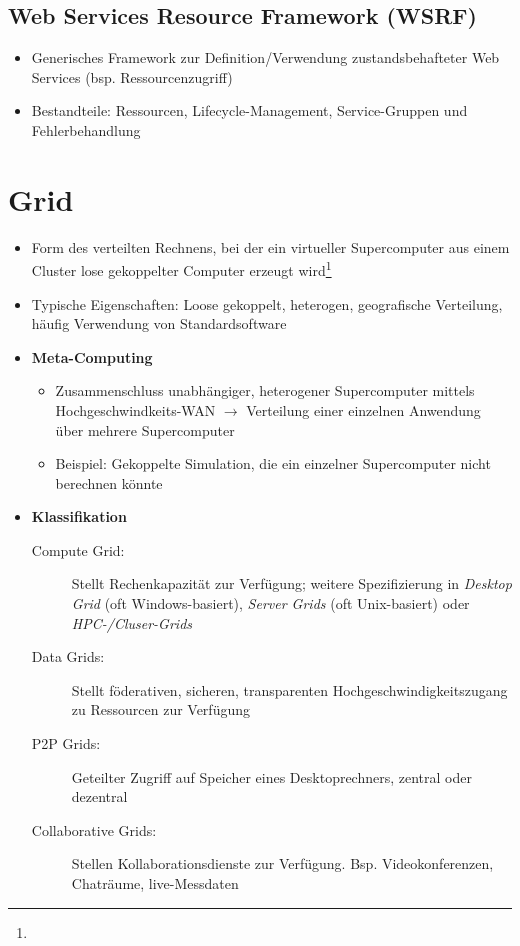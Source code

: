 \subsection{Web Services Resource Framework (WSRF)}
\begin{itemize}
	\item Generisches Framework zur Definition/Verwendung zustandsbehafteter Web Services (bsp. Ressourcenzugriff)
	\item Bestandteile: Ressourcen, Lifecycle-Management, Service-Gruppen und Fehlerbehandlung
\end{itemize}



\section{Grid}
\begin{itemize}
	\item Form des verteilten Rechnens, bei der ein virtueller Supercomputer aus einem Cluster lose gekoppelter Computer erzeugt wird\footnote{}
	\item Typische Eigenschaften: Loose gekoppelt, heterogen, geografische Verteilung, häufig Verwendung von Standardsoftware
	\item \textbf{Meta-Computing}
	\begin{itemize}
		\item Zusammenschluss unabhängiger, heterogener Supercomputer mittels Hochgeschwindkeits-WAN \(\rightarrow\) Verteilung einer einzelnen Anwendung über mehrere Supercomputer
		\item Beispiel: Gekoppelte Simulation, die ein einzelner Supercomputer nicht berechnen könnte
	\end{itemize}
	\item \textbf{Klassifikation}
	\begin{description}
		\item[Compute Grid:] Stellt Rechenkapazität zur Verfügung; weitere Spezifizierung in \textit{Desktop Grid} (oft Windows-basiert), \textit{Server Grids} (oft Unix-basiert) oder \textit{HPC-/Cluser-Grids}
		\item[Data Grids:] Stellt föderativen, sicheren, transparenten Hochgeschwindigkeitszugang zu Ressourcen zur Verfügung 
		\item[P2P Grids:] Geteilter Zugriff auf Speicher eines Desktoprechners, zentral oder dezentral
		\item[Collaborative Grids:] Stellen Kollaborationsdienste zur Verfügung. Bsp. Videokonferenzen, Chaträume, live-Messdaten
	\end{description}
\end{itemize}


